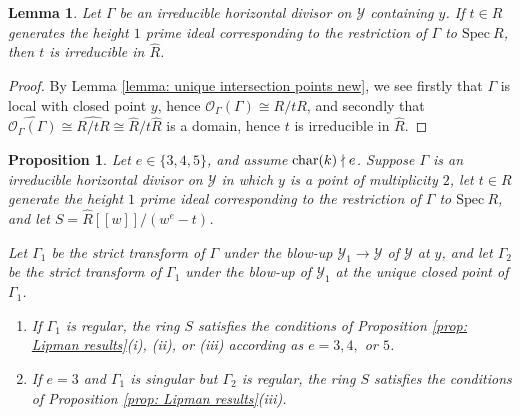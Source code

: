 \documentclass[12pt]{amsart}
\numberwithin{equation}{section}
\newtheorem{prop}[equation]{Proposition}
\newtheorem{lemma}[equation]{Lemma}
\theoremstyle{definition}
\renewcommand{\O}{\mathcal{O}}
\newcommand{\Spec}{\mathrm{Spec} \ }
\newcommand{\Y}{\mathcal{Y}}
\begin{document}
\begin{lemma}\label{lemma: analytically irreducible}
    Let $\Gamma$ be an irreducible horizontal divisor on $\Y$ containing $y$. If $t\in R$ generates the height $1$ prime ideal corresponding to the restriction of $\Gamma$ to $\Spec R$, then $t$ is irreducible in $\widehat{R}$.
\end{lemma}
\begin{proof}
    By Lemma \ref{lemma: unique intersection points new}, we see firstly that $\Gamma$ is local with closed point $y$, hence $\O_\Gamma(\Gamma)\cong R/tR$, and secondly that $\widehat{\O_\Gamma(\Gamma)}\cong \widehat{R/tR}\cong\widehat{R}/t\widehat{R}$ is a domain, hence $t$ is irreducible in $\widehat{R}$.
\end{proof}

\begin{prop}\label{prop: rational double points - Type I}
    Let $e\in\{3,4,5\}$, and assume $\textup{char}(k)\nmid e$. Suppose $\Gamma$ is an irreducible horizontal divisor on $\Y$ in which $y$ is a point of multiplicity $2$, let $t\in R$ generate the height $1$ prime ideal corresponding to the restriction of $\Gamma$ to $\Spec R$, and let $S=\widehat{R}[[w]]/(w^e-t)$.
    
    Let $\Gamma_1$ be the strict transform of $\Gamma$ under the blow-up $\Y_1\to\Y$ of $\Y$ at $y$, and let $\Gamma_2$ be the strict transform of $\Gamma_1$ under the blow-up of $\Y_1$ at the unique closed point of $\Gamma_1$.
    \begin{enumerate}[\upshape (i)]
        \item If $\Gamma_1$ is regular, the ring $S$ satisfies the conditions of Proposition \ref{prop: Lipman results}\textup{(i)}, \textup{(ii)}, or \textup{(iii)} according as $e=3,4,$ or $5$.
        \item If $e=3$ and $\Gamma_1$ is singular but $\Gamma_2$ is regular, the ring $S$ satisfies the conditions of Proposition \ref{prop: Lipman results}\textup{(iii)}.
    \end{enumerate}
\end{prop}
\end{document}
